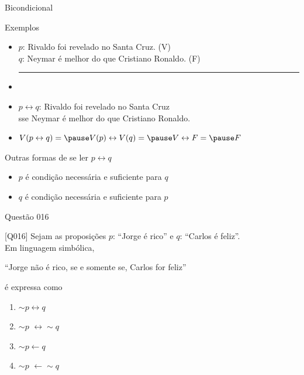 \documentclass[xcolor=dvipsnames,table]{beamer}
\begin{document}
\begin{frame}{Bicondicional}
\begin{block}{Exemplos}
\begin{itemize}
	\item $p$: Rivaldo foi revelado no Santa Cruz. \hspace*{0.9cm} (V)\\
	$q$: Neymar é melhor do que Cristiano Ronaldo. \hspace*{0.9cm} (F)\\
	\hrule
	\item \pause
	\item $p \leftrightarrow q$: Rivaldo foi revelado no Santa Cruz \\
	\hspace*{1.1cm} sse Neymar é melhor do que Cristiano Ronaldo.\\ \pause
	\vspace*{0.3cm}
	\item $V(p \leftrightarrow q) = \pause V(p) \leftrightarrow V(q) = \pause V \leftrightarrow F = \pause F$
\end{itemize}
\end{block} \pause
\begin{exampleblock}{Outras formas de se ler $p \leftrightarrow q$}
\begin{itemize}[label=-]
	\item $p$ é condição necessária e suficiente para $q$
	\item $q$ é condição necessária  e suficiente para $p$
\end{itemize}
\end{exampleblock}
\end{frame}

\begin{frame}{Questão 016}
\begin{block}{[Q016]}
	Sejam as proposições $p$: ``Jorge é rico'' e $q$: ``Carlos é feliz''. \\Em linguagem simbólica,
	\begin{center}
	``Jorge não é rico, se e somente se, Carlos for feliz''
	\end{center}
	é expressa como
\end{block}
\begin{enumerate}[label=(\Alph*)]
	\item $\sim p \leftrightarrow q$
	\item $\sim p$ $\leftrightarrow \sim q$
	\item $\sim p \leftarrow q$
	\item $\sim p$ $\leftarrow \sim q$
\end{enumerate}
\end{frame}
\end{document}
